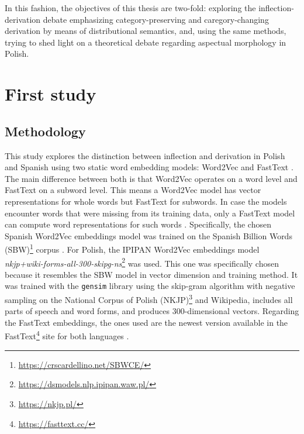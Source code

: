 \documentclass[12pt]{article}
\begin{document}
In this fashion, the objectives of this thesis are two-fold: exploring the inflection-derivation debate emphasizing category-preserving and caregory-changing derivation by means of distributional semantics, and, using the same methods, trying to shed light on a theoretical debate regarding aspectual morphology in Polish.



\section{First study} \label{first}
\subsection{Methodology} \label{methodology1}

This study explores the distinction between inflection and derivation in Polish and Spanish using two static word embedding models: Word2Vec \parencite{mikolov2013EfficientEstimationWord} and FastText \parencite{bojanowski2017EnrichingWordVectors}. The main difference between both is that Word2Vec operates on a word level and FastText on a subword level. This means a Word2Vec model has vector representations for whole words but FastText for subwords. In case the models encounter words that were missing from its training data, only a FastText model can compute word representations for such words \parencite{bojanowski2017EnrichingWordVectors}. Specifically, the chosen Spanish Word2Vec embeddings model was trained on the Spanish Billion Words (SBW)\footnote{\url{https://crscardellino.net/SBWCE/}} corpus \parencite{cardellino2016SpanishBillionWord}. For Polish, the IPIPAN Word2Vec embeddings model \textit{nkjp+wiki-forms-all-300-skipg-ns}\footnote{\url{https://dsmodels.nlp.ipipan.waw.pl/}} was used. This one was specifically chosen because it resembles the SBW model in vector dimension and training method. It was trained with the \texttt{gensim} library using the skip-gram algorithm with negative sampling on the National Corpus of Polish (NKJP)\footnote{\url{https://nkjp.pl/}} and Wikipedia, includes all parts of speech and word forms, and produces 300-dimensional vectors. Regarding the FastText embeddings, the ones used are the newest version available in the FastText\footnote{\url{https://fasttext.cc/}} site for both languages \parencite{grave2018LearningWordVectors}. 
\end{document}
